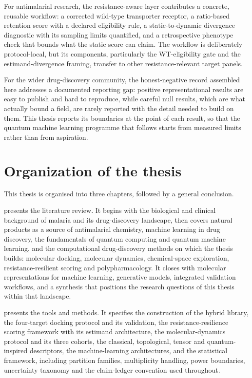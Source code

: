 For antimalarial research, the resistance-aware layer contributes a concrete, reusable workflow: a corrected wild-type transporter receptor, a ratio-based retention score with a declared eligibility rule, a static-to-dynamic divergence diagnostic with its sampling limits quantified, and a retrospective phenotype check that bounds what the static score can claim. The workflow is deliberately protocol-local, but its components, particularly the WT-eligibility gate and the estimand-divergence framing, transfer to other resistance-relevant target panels.

For the wider drug-discovery community, the honest-negative record assembled here addresses a documented reporting gap: positive representational results are easy to publish and hard to reproduce, while careful null results, which are what actually bound a field, are rarely reported with the detail needed to build on them. This thesis reports its boundaries at the point of each result, so that the quantum machine learning programme that follows starts from measured limits rather than from aspiration.

\section*{Organization of the thesis}

This thesis is organised into three chapters, followed by a general conclusion.

 presents the literature review. It begins with the biological and clinical background of malaria and its drug-discovery landscape, then covers natural products as a source of antimalarial chemistry, machine learning in drug discovery, the fundamentals of quantum computing and quantum machine learning, and the computational drug-discovery methods on which the thesis builds: molecular docking, molecular dynamics, chemical-space exploration, resistance-resilient scoring and polypharmacology. It closes with molecular representations for machine learning, generative models, integrated validation workflows, and a synthesis that positions the research questions of this thesis within that landscape.

 presents the tools and methods. It specifies the construction of the hybrid library, the four-target docking protocol and its validation, the resistance-resilience scoring framework with its estimand architecture, the molecular-dynamics protocol and its three cohorts, the classical, topological, tensor and quantum-inspired descriptors, the machine-learning architectures, and the statistical framework, including partition families, multiplicity handling, power boundaries, uncertainty taxonomy and the claim-ledger convention used throughout.


